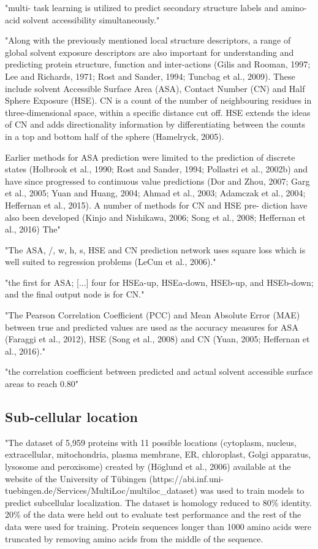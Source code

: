 \documentclass[]{scrartcl}
\begin{document}
"multi- task learning is utilized to predict secondary structure labels and amino-acid solvent accessibility simultaneously." \cite{Li2016}

"Along with the previously mentioned local structure descriptors,
a range of global solvent exposure descriptors are also important for understanding and predicting protein structure, function and inter-actions (Gilis and Rooman, 1997; Lee and Richards, 1971; Rost and Sander, 1994; Tuncbag et al., 2009). These include solvent Accessible Surface Area (ASA), Contact Number (CN) and Half Sphere Exposure (HSE). CN is a count of the number of neighbouring residues in three-dimensional space, within a specific distance cut off. HSE extends the ideas of CN and adds directionality information by differentiating between the counts in a top and bottom half of the sphere (Hamelryck, 2005).

Earlier methods for ASA prediction were limited to the prediction of discrete states (Holbrook et al., 1990; Rost and Sander, 1994; Pollastri et al., 2002b) and have since progressed to continuous value predictions (Dor and Zhou, 2007; Garg et al., 2005; Yuan and Huang, 2004; Ahmad et al., 2003; Adamczak et al., 2004; Heffernan et al., 2015). A number of methods for CN and HSE pre- diction have also been developed (Kinjo and Nishikawa, 2006; Song et al., 2008; Heffernan et al., 2016) The" \cite{Heffernan2017}

"The ASA, /, w, h, s, HSE and CN prediction network uses square loss which is well suited to regression problems (LeCun et al., 2006)." \cite{Heffernan2017}

"the first for ASA; [...] four for HSEa-up, HSEa-down, HSEb-up, and HSEb-down; and the final output node is for CN."

"The Pearson Correlation Coefficient (PCC) and Mean Absolute Error (MAE) between true and predicted values are used as the accuracy measures for ASA (Faraggi et al., 2012), HSE (Song et al., 2008) and CN (Yuan, 2005; Heffernan et al., 2016)." \cite{Heffernan2017}

"the correlation coefficient between predicted and actual solvent accessible surface areas to reach 0.80" \cite{Heffernan2017}

\subsection{Sub-cellular location}
"The dataset of 5,959 proteins with 11 possible locations (cytoplasm, nucleus, extracellular, mitochondria, plasma membrane, ER, chloroplast, Golgi apparatus, lysosome and peroxisome) created by (Höglund et al., 2006) available at the website of the University of Tübingen (https://abi.inf.uni-tuebingen.de/Services/MultiLoc/multiloc\_dataset) was used to train models to predict subcellular localization. The dataset is homology reduced to 80\% identity. 20\% of the data were held out to evaluate test performance and the rest of the data were used for training. Protein sequences longer than 1000 amino acids were truncated by removing amino acids from the middle of the sequence.
\end{document}
